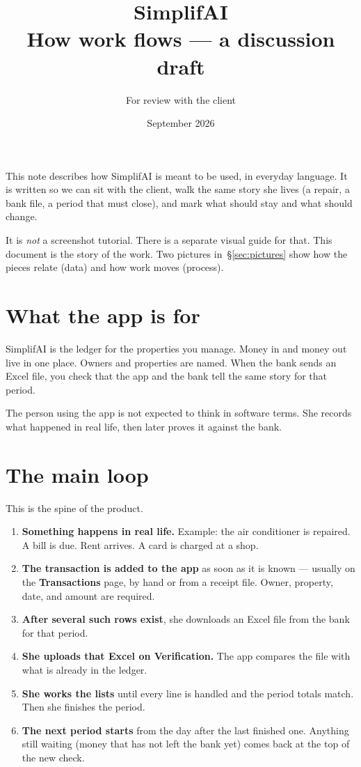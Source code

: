 \documentclass[11pt,a4paper]{article}
\title{\textbf{SimplifAI}\\[0.4em]
\large How work flows --- a discussion draft}
\author{For review with the client}
\date{September 2026}
\begin{document}
\maketitle
\thispagestyle{empty}

\noindent
This note describes how SimplifAI is meant to be used, in everyday language.
It is written so we can sit with the client, walk the same story she lives
(a repair, a bank file, a period that must close), and mark what should stay
and what should change.

\noindent
It is \emph{not} a screenshot tutorial. There is a separate visual guide for
that. This document is the story of the work.
Two pictures in~\S\ref{sec:pictures} show how the pieces relate
(data) and how work moves (process).

\tableofcontents
\newpage

\section{What the app is for}

SimplifAI is the ledger for the properties you manage.
Money in and money out live in one place.
Owners and properties are named.
When the bank sends an Excel file, you check that the app and the bank tell
the same story for that period.

The person using the app is not expected to think in software terms.
She records what happened in real life, then later proves it against the bank.

\section{The main loop}

This is the spine of the product.

\begin{enumerate}
  \item \textbf{Something happens in real life.}
        Example: the air conditioner is repaired. A bill is due.
        Rent arrives. A card is charged at a shop.
  \item \textbf{The transaction is added to the app} as soon as it is known
        --- usually on the \textbf{Transactions} page, by hand or from a
        receipt file. Owner, property, date, and amount are required.
  \item \textbf{After several such rows exist}, she downloads an Excel file
        from the bank for that period.
  \item \textbf{She uploads that Excel on Verification.}
        The app compares the file with what is already in the ledger.
  \item \textbf{She works the lists} until every line is handled and the
        period totals match. Then she finishes the period.
  \item \textbf{The next period starts} from the day after the last finished
        one. Anything still waiting (money that has not left the bank yet)
        comes back at the top of the new check.
\end{enumerate}
\end{document}
